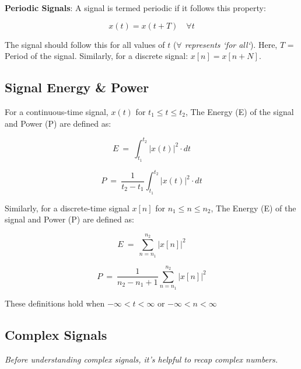 \documentclass[letterpaper,12pt]{article}
\begin{document}
\textbf{Periodic Signals}: A signal is termed periodic if it follows this property:

\begin{equation}
    x(t) = x(t + T) \quad \forall t
    \label{eq:periodic_signal_condition}
\end{equation}

The signal should follow this for all values of $t$ (\textit{$\forall$ represents `for all`}). Here, $T$ = Period of the signal. Similarly, for a discrete signal: \(x[n] = x[n + N]\).

\subsection*{Signal Energy \& Power}
For a continuous-time signal, $x(t)$ for $t_1 \le t \le t_2$, The Energy (E) of the signal and Power (P) are defined as:

\begin{equation}
    \label{eq:cont_time_energy}
    E\ =\ \int_{t_{1}}^{t_{2}}\left|x\left(t\right)\right|^{2}\cdot dt
\end{equation}

\begin{equation}
    \label{eq:cont_time_power}
    P\ =\ \frac{1}{t_{2}-t_{1}}\int_{t_{1}}^{t_{2}}\left|x\left(t\right)\right|^{2}\cdot dt
\end{equation}

Similarly, for a discrete-time signal $x[n]$ for $n_1 \le n \le n_2$, The Energy (E) of the signal and Power (P) are defined as:

\begin{equation}
    \label{eq:disc_time_energy}
    E\ =\ \sum_{n=n_{1}}^{n_{2}}\left|x\left[n\right]\right|^{2}
\end{equation}

\begin{equation}
    \label{eq:disc_time_power}
    P\ =\ \frac{1}{n_{2}-n_{1}+1}\sum_{n=n_{1}}^{n_{2}}\left|x\left[n\right]\right|^{2}
\end{equation}

These definitions hold when $-\infty < t < \infty$ or $-\infty < n < \infty$

\subsection*{Complex Signals}
\textit{Before understanding complex signals, it's helpful to recap complex numbers.}
\end{document}
